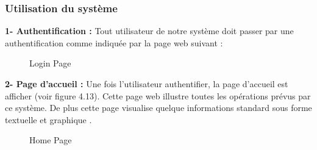 \subsubsection{Utilisation du système}
\textbf{1-  Authentification :}
\newline
Tout utilisateur de notre système doit passer par une authentification comme indiquée par la page web suivant : 



\begin{figure}[hbt]
\centering
\right
\label{fig: Login Page}

  \caption{Login Page}
\end{figure}


\textbf{2-  Page d’accueil :}
 Une fois l’utilisateur authentifier, la page d’accueil est afficher (voir figure 4.13). Cette page web illustre   toutes les opérations prévus par ce système. De plus cette page visualise quelque informations standard  sous forme textuelle et graphique .

\begin{figure}[hbt]
\centering
\right
\label{fig: Home Page}

  \caption{Home Page}
\end{figure}
\newpage
